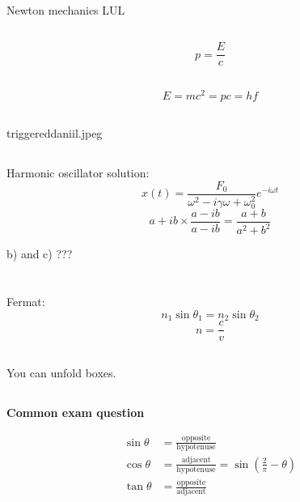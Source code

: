\documentclass[12pt]{report}
\newcommand{\exam}{\begin{center}
\textbf{Common exam question}
\end{center}}
\begin{document}
\subsection{}
Newton mechanics LUL

\subsection{}
\[p=\frac{E}{c}\]

\subsection{}

\[E=mc^2=pc=hf\]


\subsection{}
triggereddaniil.jpeg

\subsection{}
Harmonic oscillator solution:
\[x(t)=\frac{F_0}{\omega^2-i\gamma\omega+\omega_0^2}e^{-i\omega t}\]
\[a+ib\times\frac{a-ib}{a-ib}=\frac{a+b}{a^2+b^2}\]

b) and c) ???

\section{}

\subsection{}
Fermat:
\[n_1\sin\theta_1=n_2\sin\theta_2\]
\[n=\frac{c}{v}\]

\subsection{}
You can unfold boxes.

\subsection{}
\exam
\begin{align*}
\sin\theta&=\mathrm{\frac{opposite}{hypotenuse}}\\
\cos\theta&=\mathrm{\frac{adjacent}{hypotenuse}}=\sin\left(\frac{2}{\pi}-\theta\right)\\
\tan\theta&=\mathrm{\frac{opposite}{adjacent}}
\end{align*}
\end{document}
